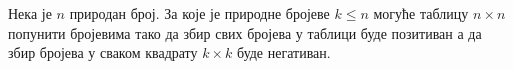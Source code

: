 Нека је $n$ природан број.
За које је природне бројеве $k \leq n$ могуће таблицу $n \times n$ попунити
бројевима тако да збир свих бројева у таблици буде позитиван а да збир бројева
у сваком квадрату $k \times k$ буде негативан.

\solution

